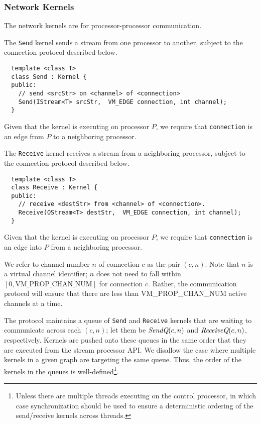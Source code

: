 \subsubsection*{Network Kernels}

The network kernels are for processor-processor communication.

 The {\tt Send} kernel sends a stream from one processor to
another, subject to the connection protocol described below.
{\small
\begin{verbatim}
  template <class T>
  class Send : Kernel {
  public:
    // send <srcStr> on <channel> of <connection>
    Send(IStream<T> srcStr,  VM_EDGE connection, int channel);
  }
\end{verbatim}}

Given that the kernel is executing on processor $P$, we require that
{\tt connection} is an edge from $P$ to a neighboring processor.

 The {\tt Receive} kernel receives a stream from a
neighboring processor, subject to the connection protocol described
below.  
{\small
\begin{verbatim}
  template <class T>
  class Receive : Kernel {
  public:
    // receive <destStr> from <channel> of <connection>.
    Receive(OStream<T> destStr,  VM_EDGE connection, int channel);
  }  
\end{verbatim}}

Given that the kernel is executing on processor $P$, we require that
{\tt connection} is an edge into $P$ from a neighboring processor.

 We refer to channel number $n$ of
connection $c$ as the pair $(c, n)$.  Note that $n$ is a virtual
channel identifier; $n$ does not need to fall within $[0,
\mbox{VM\_PROP\_CHAN\_NUM}]$ for connection $c$.  Rather, the
communication protocol will ensure that there are less than
VM\_PROP\_CHAN\_NUM active channels at a time.

The protocol maintains a queue of {\tt Send} and {\tt Receive} kernels
that are waiting to communicate across each $(c, n)$; let them be
$\mbox{\it SendQ}(c, n)$ and $\mbox{\it ReceiveQ}(c, n)$, respectively.  Kernels
are pushed onto these queues in the same order that they are executed
from the stream processor API.  We disallow the case where multiple
kernels in a given graph are targeting the same queue.  Thus, the
order of the kernels in the queues is well-defined\footnote{Unless
there are multiple threads executing on the control processor, in
which case synchronization should be used to ensure a deterministic
ordering of the send/receive kernels across threads.}.

